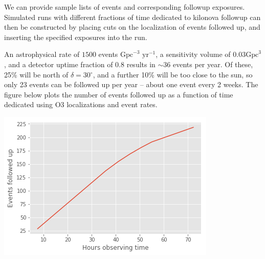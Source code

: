 \documentclass[a4paper,10pt]{article}
\newcommand{\degree}{\ensuremath{^{\circ}}}
\begin{document}
We can provide sample lists of events and corresponding followup exposures. Simulated runs with different fractions of time dedicated to kilonova followup can then be constructed by placing cuts on the localization of events followed up, and inserting the specified exposures into the run.

An astrophysical rate of $1500$ events $\mbox{Gpc}^{-3}$ $\mbox{yr}^{-1}$, a sensitivity volume of $0.03 \mbox{Gpc}^3$, and a detector uptime fraction of $0.8$ results in $\sim 36$ events per year. Of these, 25\% will be north of $\delta=30\degree$, and a further 10\% will be too close to the sun, so only 23 events can be followed up per year -- about one event every 2 weeks. The figure below plots the number of events followed up as a function of time dedicated using O3 localizations and event rates.

\begin{minipage}{\columnwidth}
\centering
 \includegraphics[width=0.5\columnwidth]{gwtoofollowupsvstime.png}
 \label{fig:followupsvstime}
\end{minipage}

\end{document}
